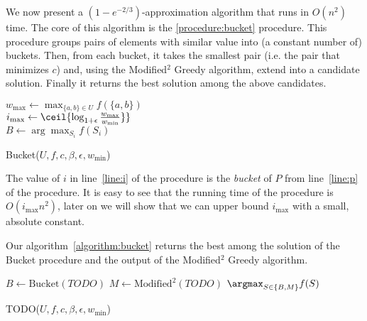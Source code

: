 \def\pLarge{P_{\text{large}}}
\def\pValuable{P_{\text{valuable}}}

We now present a $(1-e^{-2/3})$-approximation algorithm that runs in $O(n^2)$ time.
The core of this algorithm is the \ref{procedure:bucket} procedure.
This procedure groups pairs of elements with similar value into (a constant number of) buckets.
Then, from each bucket, it takes the smallest pair (i.e. the pair that minimizes $c$) and, using the Modified$^2$ Greedy algorithm, extend into a candidate solution.
Finally it returns the best solution among the above candidates.

\begin{procedure}
	$w_{\max} \leftarrow \max_{\{a, b\} \in U}f(\{a, b\})$
	\\
	$i_{\max} \leftarrow \ceil{\log_{1 + \epsilon}\frac{w_{\max}}{w_{\min}}\}}$
	\\
	$B \leftarrow \arg\max_{S_i}f(S_i)$
	\\
	\caption{Bucket($U, f, c, \beta, \epsilon, w_{\min}$)}
	\label{procedure:bucket}
\end{procedure}

The value of $i$ in line~\ref{line:i} of the procedure is the \emph{bucket} of $P$ from line~\ref{line:p} of the procedure.
It is easy to see that the running time of the procedure is $O(i_{\max}n^2)$,
later on we will show that we can upper bound $i_{\max}$ with a small, absolute constant.

Our algorithm~\ref{algorithm:bucket} returns the best among the solution of the Bucket procedure and the output of the Modified$^2$ Greedy algorithm.

\begin{algorithm}
	$B \leftarrow \text{Bucket}(TODO)$
	$M \leftarrow \text{Modified}^2(TODO)$
	\Return $\argmax_{S \in \{B, M\}}f(S)$
	\caption{TODO($U, f, c, \beta, \epsilon, w_{\min}$)}
	\label{algorithm:bucket}
\end{algorithm}

